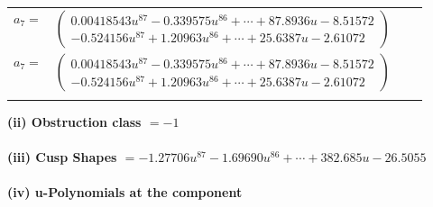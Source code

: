 \documentclass[1p]{elsarticle_modified}
\theoremstyle{definition}
\begin{document}
\begin{tabular}{m{7pt} m{180pt} m{7pt} m{180pt} }
\flushright $a_{7}=$&$\begin{pmatrix}0.00418543 u^{87}-0.339575 u^{86}+\cdots+87.8936 u-8.51572\\-0.524156 u^{87}+1.20963 u^{86}+\cdots+25.6387 u-2.61072\end{pmatrix}$\\ \flushright $a_{7}=$&$\begin{pmatrix}0.00418543 u^{87}-0.339575 u^{86}+\cdots+87.8936 u-8.51572\\-0.524156 u^{87}+1.20963 u^{86}+\cdots+25.6387 u-2.61072\end{pmatrix}$\\&\end{tabular}
\flushleft \textbf{(ii) Obstruction class $= -1$}\\~\\
\flushleft \textbf{(iii) Cusp Shapes $= -1.27706 u^{87}-1.69690 u^{86}+\cdots+382.685 u-26.5055$}\\~\\
\newpage\renewcommand{\arraystretch}{1}
\flushleft \textbf{(iv) u-Polynomials at the component}\newline \\
\end{document}
